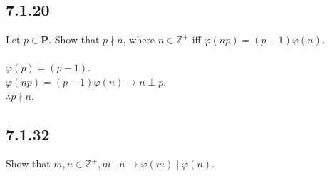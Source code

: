 \documentclass{article}
\begin{document}
\subsection{7.1.20}
Let $p \in \textbf{P}$.
Show that $p \nmid n$,
where $n \in \mathbb{Z}^+$
iff $\varphi(np) = (p-1)\varphi(n)$.
\\
\\$\varphi(p) = (p-1)$.
\\$\varphi(np) = (p-1)\varphi(n) \rightarrow n \perp p$.
\\$\therefore p \nmid n$.

\subsection{7.1.32}
Show that $m, n \in \mathbb{Z}^+, m \mid n \rightarrow
\varphi(m) \mid \varphi(n)$.
\end{document}
